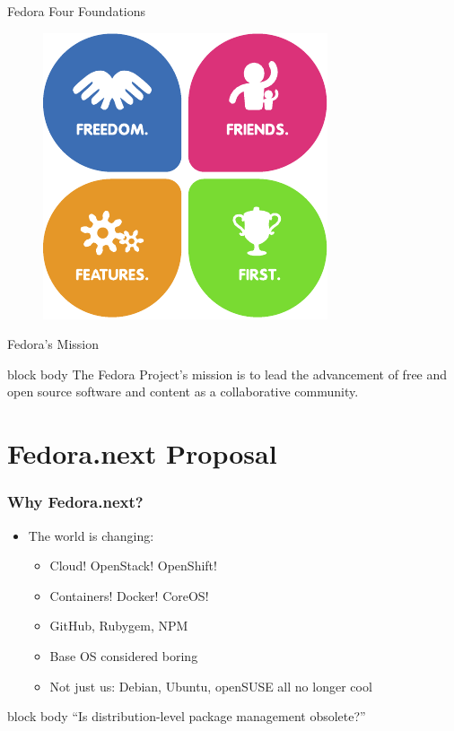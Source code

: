 \documentclass{beamer}
\begin{document}
\begin{frame}{Fedora Four Foundations}
  \begin{figure}[htbp]
    \centering
    \includegraphics[height=.7\textheight]{four_foundations.pdf}
  \end{figure}
\end{frame}

\begin{frame}{Fedora's Mission}
  \begin{beamercolorbox}[center,ht=4ex,dp=0.5ex,rounded=true]{block body}
    {\centering The Fedora Project's mission is to lead the advancement of free and
  open source software and content as a collaborative community.}
  \end{beamercolorbox}
\end{frame}

\section{Fedora.next Proposal}
\begin{frame}
  \frametitle{Why Fedora.next?}
  \begin{itemize}
    \item The world is changing:
      \begin{itemize}
        \item Cloud! OpenStack! OpenShift!
        \item Containers! Docker! CoreOS!
        \item GitHub, Rubygem, NPM
        \item Base OS considered boring
        \item Not just us: Debian, Ubuntu, openSUSE all \alert{no
          longer cool}
      \end{itemize}
  \end{itemize}
  \begin{beamercolorbox}[center,ht=2ex,dp=0.5ex,rounded=true]{block body}
    {\centering ``Is distribution-level package management
    obsolete?''}
  \end{beamercolorbox}
\end{frame}
\end{document}
